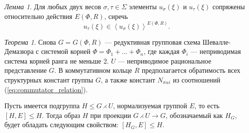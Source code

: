 \documentclass[10pt]{article}
\theoremstyle{remark}
\newtheorem{thm}{Теорема}
\newtheorem{lm}{Лемма}
\renewcommand{\le}{\leqslant}
\begin{document}
\begin{lm}\label{unipotenttransitivity}
  Для любых двух весов $\sigma, \tau \in \Sigma$ элементы $u_\sigma(\xi)$ и $u_\tau(\xi)$ сопряжены относительно действия $E(\Phi,R)$, сиречь  
  $$ u_\tau(\xi) \in \left<u_\sigma(\xi)\right>^{E(\Phi,R)}. $$
\end{lm}

\begin{thm}
  Снова $G = G(\Phi, R)$ --- редуктивная групповая схема Шевалле-Демазюра
  с системой корней $\Phi = \Phi_1 + \ldots + \Phi_n$, где каждая $\Phi_i$ --- неприводимая система корней ранга не меньше $2$. $U$ --- неприводимое рациональное представление $G$. В коммутативном кольце $R$ предполагается обратимость всех структурных констант группы $G$, а также констант $N_{\sigma\alpha i}$ из соотношений (\ref{eq:commutator_relation}).
    
  Пусть имеется подгруппа $H \le G \rightthreetimes U$, нормализуемая группой $E$, то есть $[H,E] \le H$. Тогда образ $H$ при проекции $G \rightthreetimes U \rightarrow G$, обозначаемый как $H_G$, будет обладать следующим свойством: $[H_G,E]\le H$.
\end{thm}
\end{document}
